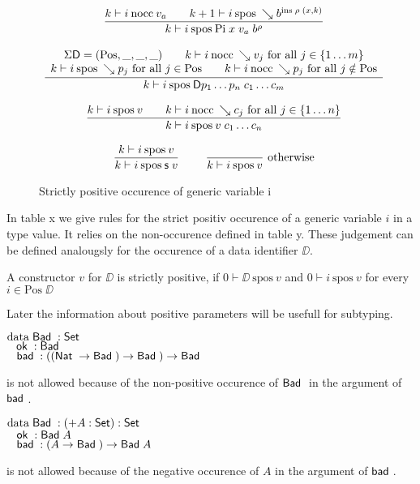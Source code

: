 \newcommand{\spos}[3]{#1\vdash#2\:\mbox{spos}\:#3}

\begin{figure}
\begin{gather*}
\nru{}
{ \nocc{k}{i}{v_a} \qquad \spos{k+1}{i}{\wh \cl{b}{\ins \; \rho \; (x,k)}}}
{\spos{k}{i}{\vpi \; x \; v_a \; \cl{b}{\rho}}  }
\\[2ex]
\ndru{}
{\Sig \DD = (\mbox{Pos},\_,\_,\_) \qquad \nocc{k}{i}{\wh v_j} \mbox{ for all } j \in \{1 \ldots m \}} 
{\spos{k}{i}{\wh p_j} \mbox{ for all } j \in \mbox{Pos} \qquad \nocc{k}{i}{\wh p_j} \mbox{ for all } j \notin \mbox{Pos} } 
{\spos{k}{i}{\DD p_1 \ldots p_n \; c_1 \ldots c_m}}
\\[2ex]
\nru{}
{\spos{k}{i}{v} \qquad \nocc{k}{i}{\wh c_j} \mbox{ for all } j \in \{1 \ldots n \}}
{\spos{k}{i}{v \; c_1 \ldots c_n}}
\\[2ex]
\nru{}
{\spos{k}{i}{v}}
{\spos{k}{i}{\s v}}
\qquad
\nrux{}
{}
{\spos{k}{i}{v}}
{\mbox{otherwise}}
\end{gather*}
\caption{Strictly positive occurence of generic variable i}
\end{figure}

In table x we give rules for the strict positiv occurence of a generic variable $i$ in a type value.
It relies on the non-occurence defined in table y.
These judgement can be defined analougsly for the occurence of a data identifier $\DD$.
\begin{definition}
A constructor $v$ for $\DD$ is strictly positive, if $\spos{0}{\DD}{v}$ and 
$\spos{0}{i}{v}$ for every $i \in \mbox{Pos}\; {\DD}$  
\end{definition}

Later the information about positive parameters will be usefull for subtyping.



\begin{bsp}
$\mathrm{data}\; \mathsf{Bad}\; : \mathsf{Set} $ \\
$\hspace*{3mm} \mathsf{ok}\; : \mathsf{Bad}\;$\\
$\hspace*{3mm} \mathsf{bad}\; : ((\mathsf{Nat}\; \rightarrow \mathsf{Bad}\;) \rightarrow \mathsf{Bad}\;) \rightarrow \mathsf{Bad}\;  $
\end{bsp}
is not allowed because of the non-positive occurence of $\mathsf{Bad}\;$ in the argument of $\mathsf{bad}\;$.

\begin{bsp}
$\mathrm{data}\; \mathsf{Bad}\; : ( + A : \mathsf{Set} ) : \mathsf{Set} $\\
$\hspace*{3mm} \mathsf{ok}\; : \mathsf{Bad}\; A$\\
$\hspace*{3mm} \mathsf{bad}\; : (A \rightarrow \mathsf{Bad}\;) \rightarrow \mathsf{Bad}\; A$
\end{bsp}
is not allowed because of the negative occurence of $A$ in the argument of $\mathsf{bad}\;$.


